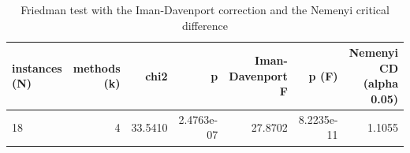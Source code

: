 \begin{table}[htbp]
\centering
\small
\caption{Friedman test with the Iman-Davenport correction and the Nemenyi critical difference}
\label{tab:E3_long_runs_b600_friedman_test}
\begin{tabular}{lrrrrrr}
\toprule
instances (N) & methods (k) & chi2 & p & Iman-Davenport F & p (F) & Nemenyi CD (alpha 0.05) \\
\midrule
18 & 4 & 33.5410 & 2.4763e-07 & 27.8702 & 8.2235e-11 & 1.1055 \\
\bottomrule
\end{tabular}
\end{table}

